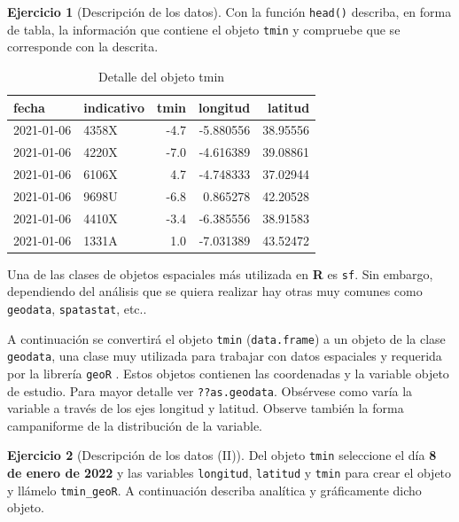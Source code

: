 \documentclass[
]{book}
\theoremstyle{definition}
\theoremstyle{definition}
\theoremstyle{definition}
\newtheorem{exercise}{Ejercicio}[chapter]
\theoremstyle{definition}
\theoremstyle{remark}
\begin{document}
\begin{exercise}[Descripción de los datos]
\protect\hypertarget{exr:ex3}{}\label{exr:ex3}Con la función \texttt{head()} describa, en forma de tabla, la información que contiene
el objeto \texttt{tmin} y compruebe que se corresponde con la descrita.
\end{exercise}

\begin{table}

\caption{\label{tab:tmin-head}Detalle del objeto tmin}
\centering
\begin{tabular}[t]{l|l|r|r|r}
\hline
fecha & indicativo & tmin & longitud & latitud\\
\hline
2021-01-06 & 4358X & -4.7 & -5.880556 & 38.95556\\
\hline
2021-01-06 & 4220X & -7.0 & -4.616389 & 39.08861\\
\hline
2021-01-06 & 6106X & 4.7 & -4.748333 & 37.02944\\
\hline
2021-01-06 & 9698U & -6.8 & 0.865278 & 42.20528\\
\hline
2021-01-06 & 4410X & -3.4 & -6.385556 & 38.91583\\
\hline
2021-01-06 & 1331A & 1.0 & -7.031389 & 43.52472\\
\hline
\end{tabular}
\end{table}

Una de las clases de objetos espaciales más utilizada en \textbf{R} es \texttt{sf}. Sin
embargo, dependiendo del análisis que se quiera realizar hay otras muy comunes
como \texttt{geodata}, \texttt{spatastat}, etc..

A continuación se convertirá el objeto \texttt{tmin} (\texttt{data.frame}) a un objeto de la
clase \texttt{geodata}, una clase muy utilizada para trabajar con datos espaciales y
requerida por la librería \texttt{geoR} \citep{R-geor}. Estos objetos contienen las
coordenadas y la variable objeto de estudio. Para mayor detalle ver
\texttt{??as.geodata}. Obsérvese como varía la variable a través de los ejes longitud y
latitud. Observe también la forma campaniforme de la distribución de la
variable.

\begin{exercise}[Descripción de los datos (II)]
\protect\hypertarget{exr:ex4}{}\label{exr:ex4}Del objeto \texttt{tmin} seleccione el día \textbf{8 de enero de 2022} y las variables
\texttt{longitud}, \texttt{latitud} y \texttt{tmin} para crear el objeto y llámelo \texttt{tmin\_geoR}. A
continuación describa analítica y gráficamente dicho objeto.
\end{exercise}
\end{document}
